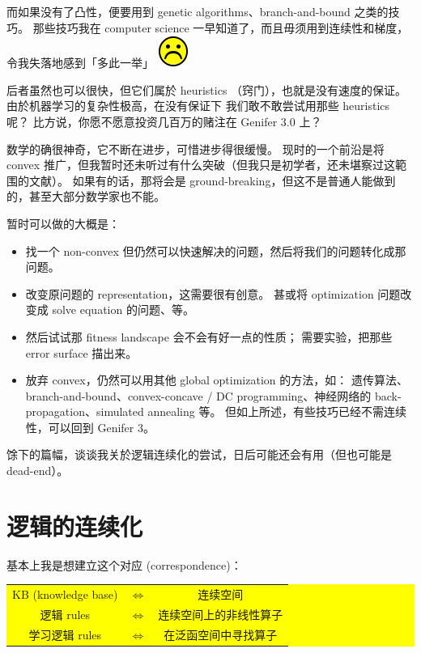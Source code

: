\documentclass[12pt]{article}
\newcommand*\sadface{\includegraphics[scale=0.25]{face-sad.png}}
\begin{document}
而如果没有了凸性，便要用到 genetic algorithms、branch-and-bound 之类的技巧。 那些技巧我在 computer science 一早知道了，而且毋须用到连续性和梯度，令我失落地感到「多此一举」  \sadface

后者虽然也可以很快，但它们属於 heuristics （窍门），也就是没有速度的保证。  由於机器学习的复杂性极高，在没有保证下 我们敢不敢尝试用那些 heuristics 呢？  比方说，你愿不愿意投资几百万的赌注在 Genifer 3.0 上？

数学的确很神奇，它不断在进步，可惜进步得很缓慢。 现时的一个前沿是将 convex 推广，但我暂时还未听过有什么突破（但我只是初学者，还未堪察过这範围的文献）。 如果有的话，那将会是 ground-breaking，但这不是普通人能做到的，甚至大部分数学家也不能。

暂时可以做的大概是：
\begin{itemize}
\item 找一个 non-convex 但仍然可以快速解决的问题，然后将我们的问题转化成那问题。
\item 改变原问题的 representation，这需要很有创意。 甚或将 optimization 问题改变成 solve equation 的问题、等。
\item 然后试试那 fitness landscape 会不会有好一点的性质；  需要实验，把那些 error surface 描出来。
\item 放弃 convex，仍然可以用其他 global optimization 的方法，如： 遗传算法、branch-and-bound、convex-concave / DC programming、神经网络的 back-propagation、simulated annealing 等。 但如上所述，有些技巧已经不需连续性，可以回到 Genifer 3。
\end{itemize}

馀下的篇幅，谈谈我关於逻辑连续化的尝试，日后可能还会有用（但也可能是 dead-end）。

\section{逻辑的连续化}

基本上我是想建立这个对应 (correspondence)：
\begin{center}
\colorbox{yellow}{\parbox{0.75\textwidth}{
\begin{tabular}{ccc}
KB (knowledge base) & $\Leftrightarrow$ & 连续空间 \\
逻辑 rules & $\Leftrightarrow$ & 连续空间上的非线性算子\\
学习逻辑 rules & $\Leftrightarrow$ & 在泛函空间中寻找算子\\ 
\end{tabular}
}}
\end{center}
\end{document}
